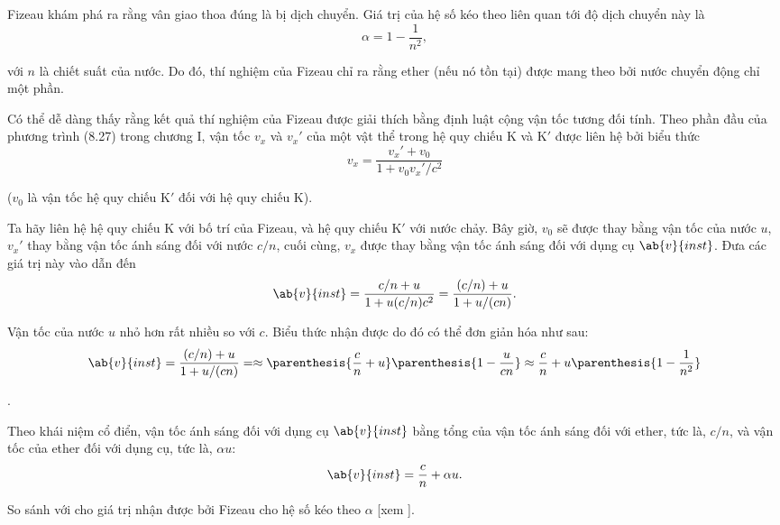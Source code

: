 Fizeau khám phá ra rằng vân giao thoa đúng là bị dịch chuyển.
Giá trị của hệ số kéo theo liên quan tới độ dịch chuyển này là
\begin{equation}\label{eq:21_3}
	\alpha = 1 - \frac{1}{n^2},
\end{equation}

\noindent
với $n$ là chiết suất của nước.
Do đó, thí nghiệm của Fizeau chỉ ra rằng ether (nếu nó tồn tại) được mang theo bởi nước chuyển động chỉ một phần.

Có thể dễ dàng thấy rằng kết quả thí nghiệm của Fizeau được giải thích bằng định luật cộng vận tốc tương đối tính.
Theo phần đầu của phương trình (8.27) trong chương I, vận tốc $v_x$ và $v_x'$ của một vật thể trong hệ quy chiếu K và K$'$ được liên hệ bởi biểu thức
\begin{equation}\label{eq:21_4}
	v_x = \frac{v_x' + v_0}{1 + v_0 v_x'/c^2}
\end{equation}

\noindent
($v_0$ là vận tốc hệ quy chiếu K$'$ đối với hệ quy chiếu K).

Ta hãy liên hệ hệ quy chiếu K với bố trí của Fizeau, và hệ quy chiếu K$'$ với nước chảy.
Bây giờ, $v_0$ sẽ được thay bằng vận tốc của nước $u$, $v_x'$ thay bằng vận tốc ánh sáng đối với nước $c/n$, cuối cùng, $v_x$ được thay bằng vận tốc ánh sáng đối với dụng cụ $\ab{v}{inst}$.
Đưa các giá trị này vào  dẫn đến
\begin{equation*}
	\ab{v}{inst} = \frac{c/n + u}{1 + u(c/n)c^2} = \frac{(c/n) + u}{1 + u/(cn)}.
\end{equation*}

\noindent
Vận tốc của nước $u$ nhỏ hơn rất nhiều so với $c$.
Biểu thức nhận được do đó có thể đơn giản hóa như sau:
\begin{equation}\label{eq:21_5}
	\ab{v}{inst} = \frac{(c/n) + u}{1 + u/(cn)} = \approx \parenthesis{\frac{c}{n}+u} \parenthesis{1 - \frac{u}{cn}} \approx \frac{c}{n} + u \parenthesis{1 - \frac{1}{n^2}}
\end{equation}

.

Theo khái niệm cổ điển, vận tốc ánh sáng đối với dụng cụ $\ab{v}{inst}$ bằng tổng của vận tốc ánh sáng đối với ether, tức là, $c/n$, và vận tốc của ether đối với dụng cụ, tức là, $\alpha u$:
\begin{equation*}
	\ab{v}{inst} = \frac{c}{n} + \alpha u.
\end{equation*}

\noindent
So sánh với  cho giá trị nhận được bởi Fizeau cho hệ số kéo theo $\alpha$ [xem ].

